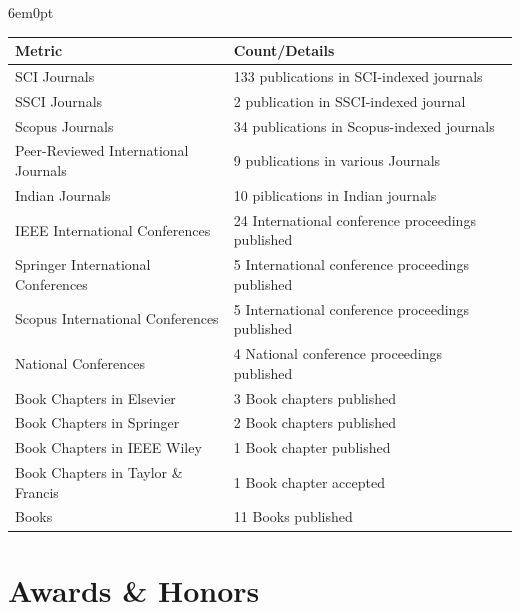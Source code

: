 \documentclass[11pt,a4paper]{moderncv}
\begin{document}
\begin{adjustwidth}{6em}{0pt}
\begin{center}
\begin{tabular}{p{7cm}p{9cm}}
	
	\hline
	\textbf{Metric} & \textbf{Count/Details} \\
	\hline
	SCI Journals& 133 publications in SCI-indexed journals \\
	SSCI Journals& 2 publication in SSCI-indexed journal \\
	Scopus Journals& 34 publications in Scopus-indexed journals \\
	Peer-Reviewed International Journals & 9 publications in various Journals \\
	Indian Journals & 10 piblications in Indian journals \\
	IEEE International Conferences & 24 International conference proceedings published \\
	Springer International Conferences  & 5 International conference proceedings published \\
	Scopus International Conferences  & 5 International conference proceedings published \\
	National Conferences  & 4 National conference proceedings published \\
	Book Chapters in Elsevier & 3 Book chapters published \\
	Book Chapters in Springer & 2 Book chapters published \\
	Book Chapters in IEEE Wiley & 1 Book chapter published \\
	Book Chapters in Taylor \& Francis & 1 Book chapter accepted \\
	Books & 11 Books published \\
	\hline
\end{tabular}
\end{center}
\end{adjustwidth}



\section{\textbf{Awards \& Honors}}
\end{document}
